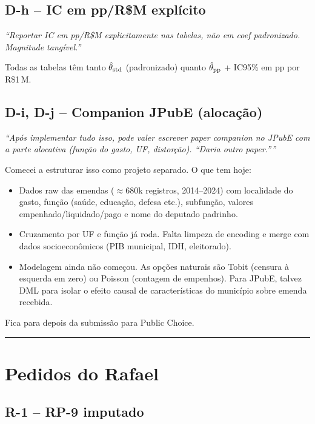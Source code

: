 \documentclass[11pt,a4paper]{article}
\newcommand{\pedido}[1]{\par\medskip\noindent\textit{\textcolor{quotegray}{#1}}\par\smallskip}
\begin{document}
\subsection*{D-h -- IC em pp/R\$M explícito}

\pedido{``Reportar IC em pp/R\$M explicitamente nas tabelas, não em coef padronizado. Magnitude tangível.''}

Todas as tabelas têm tanto $\hat\theta_{\rm std}$ (padronizado) quanto $\hat\theta_{\rm pp}$ + IC95\% em pp por R\$1\,M.

\subsection*{D-i, D-j -- Companion JPubE (alocação)}

\pedido{``Após implementar tudo isso, pode valer escrever paper companion no JPubE com a parte alocativa (função do gasto, UF, distorção). ``Daria outro paper.''''}

Comecei a estruturar isso como projeto separado. O que tem hoje:
\begin{itemize}[leftmargin=*,itemsep=1pt]
\item Dados raw das emendas ($\approx$680k registros, 2014--2024) com localidade do gasto, função (saúde, educação, defesa etc.), subfunção, valores empenhado/liquidado/pago e nome do deputado padrinho.
\item Cruzamento por UF e função já roda. Falta limpeza de encoding e merge com dados socioeconômicos (PIB municipal, IDH, eleitorado).
\item Modelagem ainda não começou. As opções naturais são Tobit (censura à esquerda em zero) ou Poisson (contagem de empenhos). Para JPubE, talvez DML para isolar o efeito causal de características do município sobre emenda recebida.
\end{itemize}

Fica para depois da submissão para Public Choice.

\bigskip\hrule\bigskip

\section{Pedidos do Rafael}

\subsection*{R-1 -- RP-9 imputado}
\end{document}
